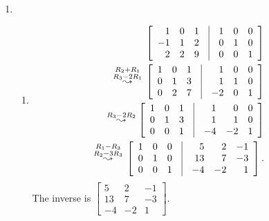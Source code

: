 \documentclass[12pt]{article}
\begin{document}
\begin{enumerate}
\item \begin{enumerate}
\item
\begin{eqnarray*}
& &
\left[ \begin{array}{rrrcrrr} 1 & 0 & 1 & \vline & 1 & 0 & 0\\
                             -1 & 1 & 2 & \vline & 0 & 1 & 0\\
                              2 & 2 & 9 & \vline & 0 & 0 & 1
\end{array} \right]
\\&&\hspace{-12mm}
\overset{\begin{smallmatrix}R_2+R_1\\R_3-2R_1\end{smallmatrix}}{\leadsto}
\left[ \begin{array}{rrrcrrr} 1 & 0 & 1 & \vline & 1 & 0 & 0\\
                              0 & 1 & 3 & \vline & 1 & 1 & 0\\
                              0 & 2 & 7 & \vline & -2 & 0 & 1
\end{array} \right]
\\&&\hspace{-11mm}
\overset{R_3-2R_2}{\leadsto}
\left[ \begin{array}{rrrcrrr} 1 & 0 & 1 & \vline & 1 & 0 & 0\\
                               0 & 1 & 3 & \vline & 1 & 1 & 0\\
                               0 & 0 & 1 & \vline & -4 & -2 & 1
\end{array} \right]
\\&&\hspace{-12mm}
\overset{\begin{smallmatrix}R_1-R_3\\R_2-3R_3\end{smallmatrix}}{\leadsto}
\left[\begin{array}{rrrcrrr} 1 & 0 & 0 & \vline & 5 & 2 & -1\\
                               0 & 1 & 0 & \vline & 13 & 7 & -3\\
                               0 & 0 & 1 & \vline & -4 & -2 & 1
\end{array} \right].
\end{eqnarray*}
The inverse is
$\left[ \begin{array}{rrr} 5&2&-1\\13&7&-3\\-4&-2&1 \end{array} \right]$.

\end{enumerate}
\end{enumerate}
\end{document}
